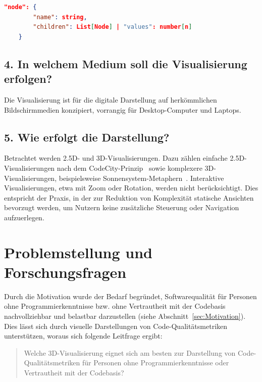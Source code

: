 \begin{lstlisting}[language=json, caption={Knotenschema}, label={lst:nodeSchema}]
    "node": {
        "name": string,
        "children": List[Node] | "values": number[n]
    }
\end{lstlisting}

\subsection*{4. In welchem Medium soll die Visualisierung erfolgen?}
Die Visualisierung ist für die digitale Darstellung auf herkömmlichen Bildschirmmedien konzipiert, vorrangig für Desktop-Computer und Laptops.

\subsection*{5. Wie erfolgt die Darstellung?}
Betrachtet werden 2{.}5D- und 3D-Visualisierungen. Dazu zählen einfache 2{.}5D-Visualisierungen nach dem CodeCity-Prinzip~\cite{codeCity1} sowie komplexere 3D-Visualisierungen, beispielsweise Sonnensystem-Metaphern~\cite{solarSystem}. Interaktive Visualisierungen, etwa mit Zoom oder Rotation, werden nicht berücksichtigt. Dies entspricht der Praxis, in der zur Reduktion von Komplexität statische Ansichten bevorzugt werden, um Nutzern keine zusätzliche Steuerung oder Navigation aufzuerlegen.

\section{Problemstellung und Forschungsfragen} \label{sec:Problemstellung}

Durch die Motivation wurde der Bedarf begründet, Softwarequalität für Personen ohne Programmierkenntnisse bzw. ohne Vertrautheit mit der Codebasis nachvollziehbar und belastbar darzustellen (siehe Abschnitt~\ref{sec:Motivation}). Dies lässt sich durch visuelle Darstellungen von Code-Qualitätsmetriken unterstützen, woraus sich folgende Leitfrage ergibt:

\begin{quote}
    Welche 3D-Visualisierung eignet sich am besten zur Darstellung von Code-Qualitätsmetriken für Personen ohne Programmierkenntnisse oder Vertrautheit mit der Codebasis?
\end{quote}

